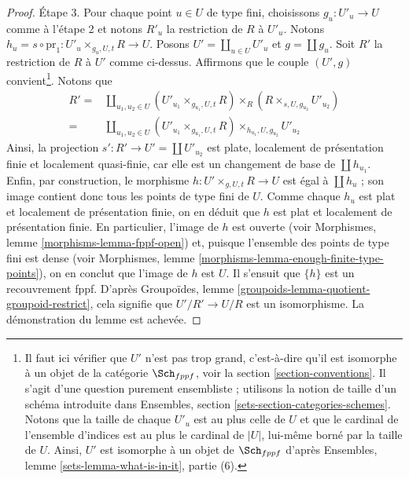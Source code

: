 \begin{proof}
\medskip\noindent
Étape 3. Pour chaque point $u \in U$ de type fini,
choisissons $g_u : U'_u \to U$ comme à
l'étape 2 et notons $R'_u$ la restriction de $R$ à $U'_u$.
Notons $h_u = s \circ \text{pr}_1 : U'_u \times_{g_u, U, t} R \to U$. Posons
$U' = \coprod_{u \in U} U'_u$ et $g = \coprod g_u$. Soit $R'$ la
restriction de $R$ à $U'$ comme ci-dessus. Affirmons que
le couple $(U', g)$ convient\footnote{Il faut ici vérifier que $U'$ n'est pas
trop grand, c'est-à-dire qu'il est isomorphe à un objet de la catégorie
$\Sch_{fppf}$, voir la
section \ref{section-conventions}.
Il s'agit d'une question purement ensembliste ; utilisons la notion de taille d'un
schéma introduite dans
Ensembles, section \ref{sets-section-categories-schemes}.
Notons que la taille de chaque $U'_u$ est au plus celle de $U$
et que le cardinal de l'ensemble d'indices est au plus le cardinal de
$|U|$, lui-même borné par la taille de $U$. Ainsi, $U'$ est isomorphe
à un objet de $\Sch_{fppf}$ d'après
Ensembles, lemme \ref{sets-lemma-what-is-in-it}, partie (6).}.
Notons que
\begin{align*}
R' = &
\coprod\nolimits_{u_1, u_2 \in U}
(U'_{u_1} \times_{g_{u_1}, U, t} R)
\times_R
(R \times_{s, U, g_{u_2}} U'_{u_2}) \\
= &
\coprod\nolimits_{u_1, u_2 \in U}
(U'_{u_1} \times_{g_{u_1}, U, t} R) \times_{h_{u_1}, U, g_{u_2}} U'_{u_2}
\end{align*}
Ainsi, la projection $s' : R' \to U' = \coprod U'_{u_2}$
est plate, localement de
présentation finie et localement quasi-finie, car elle est un changement de base de $\coprod h_{u_1}$.
Enfin, par construction, le morphisme
$h : U' \times_{g, U, t} R \to U$ est égal à $\coprod h_u$ ; son
image contient donc tous les points de type fini de $U$.
Comme chaque $h_u$ est plat et localement de présentation finie, on en déduit que
$h$ est plat et localement de présentation finie.
En particulier, l'image de $h$ est ouverte (voir
Morphismes, lemme \ref{morphisms-lemma-fppf-open})
et, puisque l'ensemble des points de type fini est dense (voir
Morphismes, lemme \ref{morphisms-lemma-enough-finite-type-points}),
on en conclut que l'image de $h$ est $U$. Il s'ensuit que
$\{h\}$ est un recouvrement fppf. D'après
Groupoïdes, lemme \ref{groupoids-lemma-quotient-groupoid-restrict},
cela signifie que $U'/R' \to U/R$ est un isomorphisme.
La démonstration du lemme est achevée.
\end{proof}










